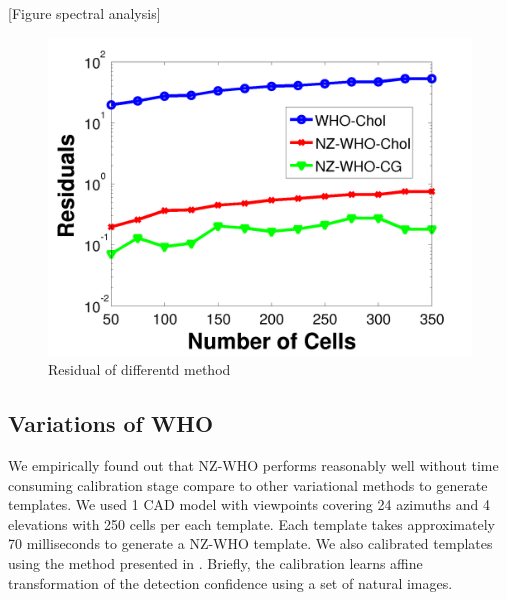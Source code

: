 \documentclass[10pt,twocolumn,letterpaper]{article}
\begin{document}
[Figure spectral analysis]

\begin{figure}[t]
  \centering
  \includegraphics[width=0.5\linewidth]{residual}
  \caption{Residual of differentd method}
  \label{fig:whotime}
\end{figure}

\subsection{Variations of WHO}

We empirically found out that NZ-WHO performs reasonably well without time consuming calibration stage compare to other variational methods to generate templates. We used 1 CAD model with viewpoints covering 24 azimuths and 4 elevations with 250 cells per each template. Each template takes approximately 70 milliseconds to generate a NZ-WHO template. We also calibrated templates using the method presented in \cite{Aubry14}. Briefly, the calibration learns affine transformation of the detection confidence using a set of natural images.%
\end{document}
